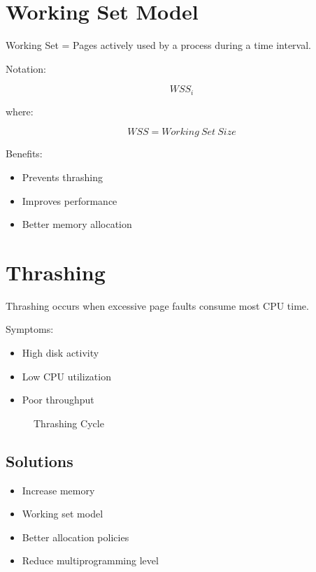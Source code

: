 \section{Working Set Model}

Working Set = Pages actively used by a process during a time interval.

Notation:

\[
WSS_i
\]

where:

\[
WSS = Working\ Set\ Size
\]

Benefits:

\begin{itemize}
\item Prevents thrashing
\item Improves performance
\item Better memory allocation
\end{itemize}

\section{Thrashing}

Thrashing occurs when excessive page faults consume most CPU time.

Symptoms:

\begin{itemize}
\item High disk activity
\item Low CPU utilization
\item Poor throughput
\end{itemize}

\begin{figure}[H]
\centering
{}
\caption{Thrashing Cycle}
\end{figure}

\subsection{Solutions}

\begin{itemize}
\item Increase memory
\item Working set model
\item Better allocation policies
\item Reduce multiprogramming level
\end{itemize}

